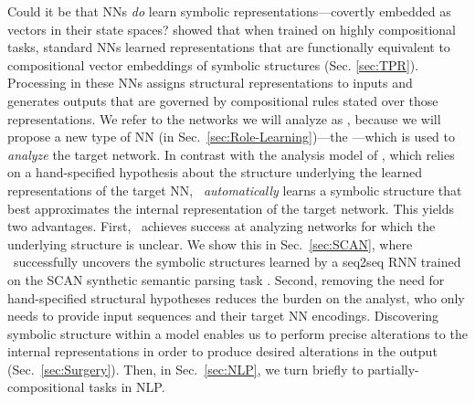 Could it be that NNs \textit{do} learn symbolic representations---covertly embedded as vectors in their state spaces?
\citet{mccoy} showed that 
when trained on highly compositional tasks, 
standard NNs learned representations that are functionally equivalent to compositional vector embeddings of symbolic structures (Sec. \ref{sec:TPR}). Processing in these NNs assigns structural representations to inputs and generates outputs that are governed by compositional rules stated over those representations. We refer to the networks we will analyze as , because we will propose a new type of NN (in Sec.~\ref{sec:Role-Learning})---the ---which is used to \textit{analyze} the target network.
In contrast with the analysis model of \citet{mccoy}, which relies on a hand-specified hypothesis about the structure underlying the learned representations of the target NN, \RLN\ \textit{automatically} learns a symbolic structure that best approximates the internal representation of the target network. This yields 
two %
advantages. 
First, \RLN\ achieves success at analyzing networks for which the underlying structure is unclear. We show this in Sec.~\ref{sec:SCAN}, where \RLN\ successfully uncovers the symbolic structures learned by a seq2seq RNN trained on the SCAN synthetic semantic parsing task \citep{lake2018generalization}. Second, removing the need for hand-specified structural hypotheses reduces the burden on the analyst, who only needs to provide input sequences and their target NN encodings. Discovering symbolic structure within a model enables us to perform precise alterations to the internal representations in order to produce desired alterations in the output (Sec.~\ref{sec:Surgery}). Then, in Sec.~\ref{sec:NLP}, we turn briefly to partially-compositional tasks in NLP.

